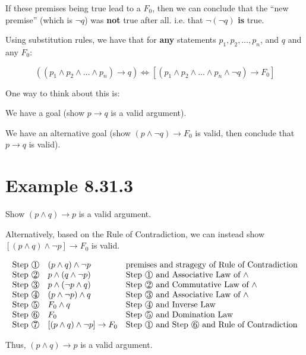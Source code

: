 \documentclass{article}
\newcommand{\numbercircled}[1]{\raisebox{.5pt}{\textcircled{\raisebox{-.9pt} {#1}}}}
\newcommand{\step}[1]{\text{Step \numbercircled{#1}}}
\begin{document}
If these premises being true lead to a $F_0$, then we can conclude
that the ``new premise'' (which is $\neg{}q$) was \textbf{not} true
after all. i.e. that $\neg(\neg{}q)$ \textbf{is} true.

Using substitution rules, we have that for \textbf{any} statements
$p_1,p_2,\dots,p_n$, and $q$ and any $F_0$:

\[
\left(\left(p_1\wedge p_2\wedge\dots\wedge p_n\right)\rightarrow q\right)
\Leftrightarrow
\left\lbrack\left(p_1\wedge p_2\wedge\dots\wedge p_n\wedge\neg q\right)\rightarrow F_0\right\rbrack
\]

One way to think about this is:

We have a goal (show $p\rightarrow{}q$ is a valid argument).

We have an alternative goal (show $(p\wedge\neg{}q)\rightarrow{}F_0$
is valid, then conclude that $p\rightarrow{}q$ is valid).

\section*{Example 8.31.3}

Show $(p\wedge{}q)\rightarrow{}p$ is a valid argument.

Alternatively, based on the Rule of Contradiction, we can instead show
$\left\lbrack(p\wedge{}q)\wedge\neg{}p\right\rbrack\rightarrow{}F_0$
is valid.

\[
\begin{array}{cll}
\step{1} & (p\wedge q)\wedge\neg p & \text{premises and stragegy of Rule of Contradiction} \\
\step{2} & p\wedge (q\wedge\neg p) & \text{\step{1} and Associative Law of $\wedge$} \\
\step{3} & p\wedge(\neg p\wedge q) & \text{\step{2} and Commutative Law of $\wedge$} \\
\step{4} & (p\wedge\neg p)\wedge q & \text{\step{3} and Associative Law of $\wedge$} \\
\step{5} & F_0\wedge q & \text{\step{4} and Inverse Law} \\
\step{6} & F_0 & \text{\step{5} and Domination Law} \\
\step{7} & \lbrack(p\wedge q)\wedge\neg p\rbrack\rightarrow F_0 & \text{\step{1} and \step{6} and Rule of Contradiction} \\
\end{array}
\]

Thus, $(p\wedge{}q)\rightarrow{}p$ is a valid argument.
\end{document}
